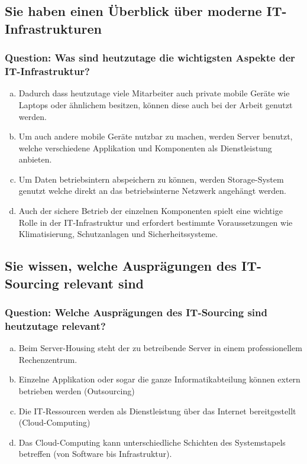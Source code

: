 \documentclass{article}
\begin{document}
\begin{adjustwidth}{2em}{2em}
\begin{adjustwidth}{2em}{2em}
			\subsection{Sie haben einen Überblick über moderne IT-Infrastrukturen}
			\begin{adjustwidth}{1em}{}
				\subsubsection*{Question: Was sind heutzutage die wichtigsten Aspekte der IT-Infrastruktur?}
				\begin{adjustwidth}{1em}{}
					\begin{enumerate}[(a)]
						\item Dadurch dass heutzutage viele Mitarbeiter auch private mobile Geräte wie Laptops oder ähnlichem besitzen, können diese auch bei der Arbeit genutzt werden.
						\item Um auch andere mobile Geräte nutzbar zu machen, werden Server benutzt, welche verschiedene Applikation und Komponenten als Dienstleistung anbieten.
						\item Um Daten betriebsintern abspeichern zu können, werden Storage-System genutzt welche direkt an das betriebsinterne Netzwerk angehängt werden.
						\item Auch der sichere Betrieb der einzelnen Komponenten spielt eine wichtige Rolle in der IT-Infrastruktur und erfordert bestimmte Voraussetzungen wie Klimatisierung, Schutzanlagen und Sicherheitssysteme.
					\end{enumerate}
				\end{adjustwidth}
			\end{adjustwidth}
			\subsection{Sie wissen, welche Ausprägungen des IT-Sourcing relevant sind}
			\begin{adjustwidth}{1em}{}
				\subsubsection*{Question: Welche Ausprägungen des IT-Sourcing sind heutzutage relevant?}
				\begin{adjustwidth}{1em}{}
					\begin{enumerate}[(a)]
						\item Beim Server-Housing steht der zu betreibende Server in einem professionellem Rechenzentrum.
						\item Einzelne Applikation oder sogar die ganze Informatikabteilung können extern betrieben werden (Outsourcing)
						\item Die IT-Ressourcen werden als Dienstleistung über das Internet bereitgestellt (Cloud-Computing)
						\item Das Cloud-Computing kann unterschiedliche Schichten des Systemstapels betreffen (von Software bis Infrastruktur).
					\end{enumerate}
				\end{adjustwidth}
			\end{adjustwidth}

\end{adjustwidth}
\end{adjustwidth}
\end{document}
